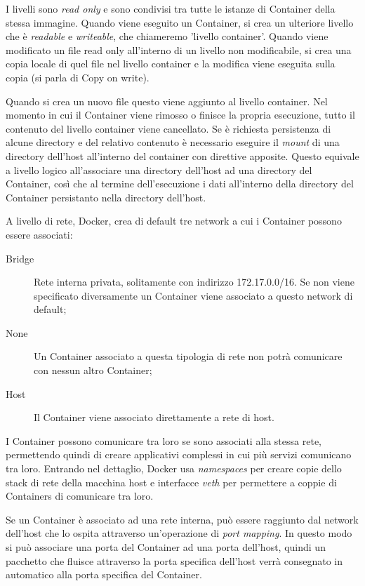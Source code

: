 I livelli sono \textit{read only} e sono condivisi tra tutte le istanze di Container della stessa immagine. Quando viene eseguito un Container, si crea un ulteriore livello che è \textit{readable} e \textit{writeable}, che chiameremo 'livello container'. Quando viene modificato un file read only all'interno di un  livello non modificabile, si crea una copia locale di quel file nel livello container e la modifica viene eseguita sulla  copia (si parla di Copy on write).

Quando si crea un nuovo file questo viene aggiunto  al livello container. Nel momento in cui il Container viene rimosso o finisce la propria esecuzione, tutto il contenuto del livello container viene cancellato. Se è richiesta  persistenza di alcune directory  e del relativo contenuto è necessario eseguire il \textit{mount} di una directory dell'host all'interno del container con direttive apposite.  Questo equivale a livello logico all'associare una directory dell'host ad una directory del Container, così che al termine dell'esecuzione i dati all'interno della directory del Container persistanto nella directory dell'host.

A livello di rete, Docker, crea di default tre network a cui i Container possono essere associati:
\begin{description}
    \item[Bridge] Rete interna privata, solitamente con indirizzo 172.17.0.0/16. Se non viene specificato diversamente un Container viene associato a questo network di default;
    \item[None] Un Container associato a questa tipologia di rete non potrà comunicare con nessun altro Container;
    \item[Host] Il Container viene associato direttamente a rete di host.
\end{description}

I Container possono comunicare tra loro se sono associati alla stessa rete, permettendo quindi di creare applicativi complessi in cui più servizi comunicano tra loro.
Entrando nel dettaglio, Docker usa \textit{namespaces} per creare copie dello stack di rete della macchina host  e interfacce \textit{veth} per permettere a coppie di Containers di comunicare tra loro.

Se un Container è associato ad una rete interna, può essere raggiunto dal network dell'host che lo ospita attraverso un'operazione di \textit{port mapping}. In questo modo si può associare una porta del Container ad una porta dell'host, quindi un pacchetto che fluisce attraverso la porta specifica dell'host verrà consegnato in automatico alla porta specifica del Container.



